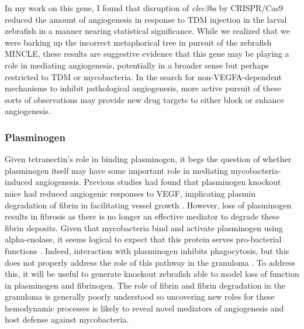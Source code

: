 In my work on this gene, I found that disruption of \textit{clec3ba} by CRISPR/Cas9 reduced the amount of angiogenesis in response to TDM injection in the larval zebrafish in a manner nearing statistical significance. While we realized that we were barking up the incorrect metaphorical tree in pursuit of the zebrafish MINCLE, these results are suggestive evidence that this gene may be playing a role in mediating angiogenesis, potentially in a broader sense but perhaps restricted to TDM or mycobacteria. In the search for non\hyp{}VEGFA-dependent mechanisms to inhibit pathological angiogenesis, more active pursuit of these sorts of observations may provide new drug targets to either block or enhance angiogenesis. 

\subsubsection{Plasminogen}\label{plg}

Given tetranectin's role in binding plasminogen, it begs the question of whether plasminogen itself may have some important role in mediating mycobacteria-induced angiogenesis. Previous studies had found that plasminogen knockout mice had reduced angiogenic responses to VEGF, implicating plasmin degradation of fibrin in facilitating vessel growth \citep{Oh2003}. However, loss of plasminogen results in fibrosis as there is no longer an effective mediator to degrade these fibrin deposits. Given that mycobacteria bind and activate plasminogen using alpha\hyp{}enolase, it seems logical to expect that this protein serves pro\hyp{}bacterial functions \citep{Monroy2000}. Indeed, interaction with plasminogen inhibits phagocytosis, but this does not properly address the role of this pathway in the granuloma \citep{EcheverriaValencia2019}. To address this, it will be useful to generate knockout zebrafish able to model loss of function in plasminogen and fibrinogen. The role of fibrin and fibrin degradation in the granuloma is generally poorly understood so uncovering new roles for these hemodynamic processes is likely to reveal novel mediators of angiogenesis and host defense against mycobacteria.

